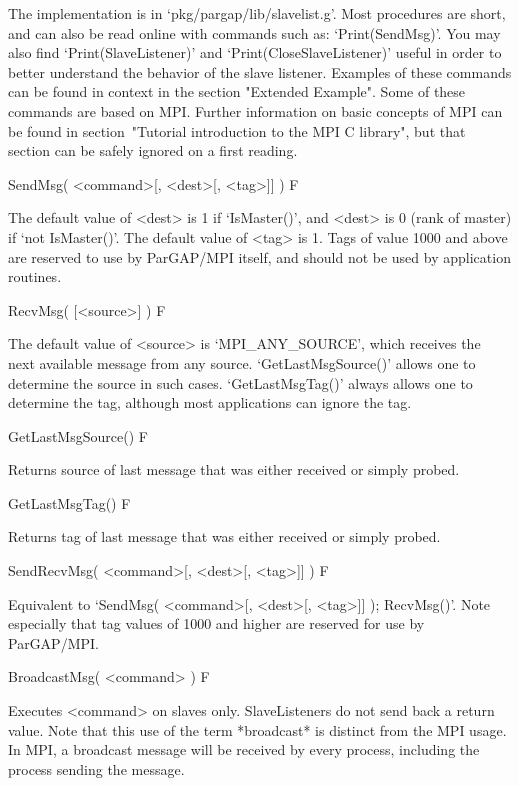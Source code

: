 
The implementation is in `pkg/pargap/lib/slavelist.g'.  Most
procedures are short, and can also be read online with commands such
as: `Print(SendMsg)'.  You may also find `Print(SlaveListener)' and
`Print(CloseSlaveListener)' useful in order to better understand the
behavior of the slave listener.  Examples of these commands can be
found in context in the section "Extended Example".  Some of these
commands are based on MPI.  Further information on basic concepts of
MPI can be found in section~"Tutorial introduction to the MPI C
library", but that section can be safely ignored on a first reading.

\>SendMsg( <command>[, <dest>[, <tag>]] ) F

The default value of <dest> is 1 if `IsMaster()', and <dest> is 0 (rank
of master) if `not IsMaster()'.  The default value of <tag> is 1.
Tags of value 1000 and above are reserved to use by ParGAP/MPI itself,
and should not be used by application routines.

\>RecvMsg( [<source>] ) F

The default value of <source> is `MPI_ANY_SOURCE', which receives the
next available message from any source.  `GetLastMsgSource()' allows
one to determine the source in such cases.  `GetLastMsgTag()' always
allows one to determine the tag, although most applications can ignore
the tag.

\>GetLastMsgSource() F

  Returns source of last message that was either received or simply probed.

\>GetLastMsgTag() F

  Returns tag of last message that was either received or simply probed.

\>SendRecvMsg( <command>[, <dest>[, <tag>]] ) F

  Equivalent to `SendMsg( <command>[, <dest>[, <tag>]] ); RecvMsg()'.
  Note especially that tag values of 1000 and higher are reserved for
  use by ParGAP/MPI.

\>BroadcastMsg( <command> ) F

   Executes <command> on slaves only.  SlaveListeners do not send back
   a return value.  Note that this use of the term *broadcast* is
   distinct from the MPI usage.  In MPI, a broadcast message will be
   received by every process, including the process sending the message.


